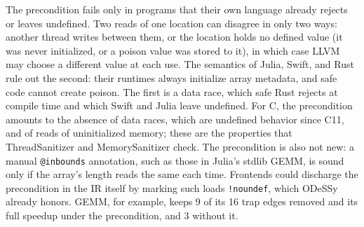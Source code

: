 \documentclass[acmsmall,screen,nonacm]{acmart}
\newcommand{\odessy}{ODeSSy}
\newcommand{\tool}{\odessy}
\begin{document}
The precondition fails only in programs that their own language already
rejects or leaves undefined. Two reads of one location can disagree in only
two ways: another thread writes between them, or the location holds no
defined value (it was never initialized, or a poison value was stored to
it), in which case LLVM may choose a different value at each use. The semantics of Julia, Swift, and Rust rule out the second: their runtimes always initialize array
metadata, and safe code cannot create poison. The first is a data race,
which safe Rust rejects at compile time and which Swift and Julia leave
undefined. For C, the precondition amounts to the absence of data races,
which are undefined behavior since C11, and of reads of uninitialized
memory; these are the properties that ThreadSanitizer and MemorySanitizer
check. The precondition is also not new: a manual \texttt{@inbounds}
annotation, such as those in Julia's stdlib GEMM, is sound only if the
array's length reads the same each time. Frontends could discharge the
precondition in the IR itself by marking such loads \texttt{!noundef},
which \tool{} already honors. GEMM, for example, keeps 9 of its 16 trap
edges removed and its full speedup under the precondition, and 3 without
it.
\end{document}

